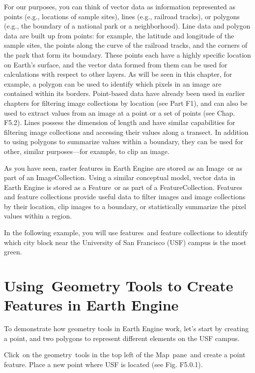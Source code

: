 \documentclass[
  letterpaper,
  DIV=11,
  numbers=noendperiod]{scrreprt}
\begin{document}
For our purposes, you can think of vector data as information
represented as points (e.g., locations of sample sites), lines (e.g.,
railroad tracks), or polygons (e.g., the boundary of a national park or
a neighborhood). Line data and polygon data are built up from points:
for example, the latitude and longitude of the sample sites, the points
along the curve of the railroad tracks, and the corners of the park that
form its boundary. These points each have a highly specific location on
Earth's surface, and the vector data formed from them can be used for
calculations with respect to other layers. As will be seen in this
chapter, for example, a polygon can be used to identify which pixels in
an image are contained within its borders. Point-based data have already
been used in earlier chapters for filtering image collections by
location (see Part F1), and can also be used to extract values from an
image at a point or a set of points (see Chap. F5.2). Lines possess the
dimension of length and have similar capabilities for filtering image
collections and accessing their values along a transect. In addition to
using polygons to summarize values within a boundary, they can be used
for other, similar purposes---for example, to clip an image.

As you have seen, raster features in Earth Engine are stored as an
Image~or as part of an ImageCollection. Using a similar conceptual
model, vector data in Earth Engine is stored as a Feature~or as part of
a FeatureCollection. Features and feature collections provide useful
data to filter images and image collections by their location, clip
images to a boundary, or statistically summarize the pixel values within
a region.

In the following example, you will use features~and feature collections
to identify which city block near the University of San Francisco (USF)
campus is the most green.

\hypertarget{using-geometry-tools-to-create-features-in-earth-engine}{%
\section{Using~Geometry Tools to Create Features in Earth
Engine}\label{using-geometry-tools-to-create-features-in-earth-engine}}

To demonstrate how geometry tools in Earth Engine work, let's start by
creating a point, and two polygons to represent different elements on
the USF campus.

Click~on the geometry~tools in the top left of the Map~pane~and create a
point feature. Place a new point where USF is located (see Fig. F5.0.1).
\end{document}
